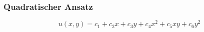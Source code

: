 \subsubsection{Quadratischer Ansatz
\label{fem:subsection:bonorum}}

\begin{equation}
	u(x,y) = c_1 + c_2 x + c_3 y + c_4 x^2 + c_5 xy + c_6 y^2
	\label{fem:equationSchwarzquadratischD}
\end{equation}


